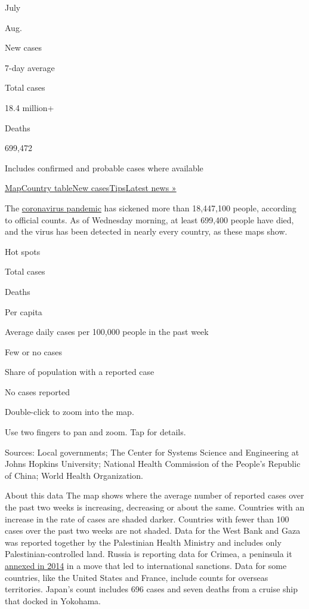 July

Aug.

New cases

7-day average

Total cases

18.4 million+

Deaths

699,472

Includes confirmed and probable cases where available

\protect\hyperlink{map}{Map}\protect\hyperlink{countries}{Country
table}\protect\hyperlink{cases}{New
cases}\protect\hyperlink{tips}{Tips}\href{https://www.nytimes.com/2020/08/04/world/coronavirus-covid-19.html}{Latest
news »}

The
\href{https://www.nytimes.com/article/prepare-for-coronavirus.html}{coronavirus
pandemic} has sickened more than 18,447,100 people, according to
official counts. As of Wednesday morning, at least 699,400 people have
died, and the virus has been detected in nearly every country, as these
maps show.

Hot spots

Total cases

Deaths

Per capita

Average daily cases per 100,000 people in the past week

Few or no cases

Share of population with a reported case

No cases reported

Double-click to zoom into the map.

Use two fingers to pan and zoom. Tap for details.

Sources: Local governments; The Center for Systems Science and
Engineering at Johns Hopkins University; National Health Commission of
the People's Republic of China; World Health Organization.

About this data The map shows where the average number of reported cases
over the past two weeks is increasing, decreasing or about the same.
Countries with an increase in the rate of cases are shaded darker.
Countries with fewer than 100 cases over the past two weeks are not
shaded. Data for the West Bank and Gaza was reported together by the
Palestinian Health Ministry and includes only Palestinian-controlled
land. Russia is reporting data for Crimea, a peninsula it
\href{https://www.nytimes.com/2014/03/19/world/europe/ukraine.html}{annexed
in 2014} in a move that led to international sanctions. Data for some
countries, like the United States and France, include counts for
overseas territories. Japan's count includes 696 cases and seven deaths
from a cruise ship that docked in Yokohama.

